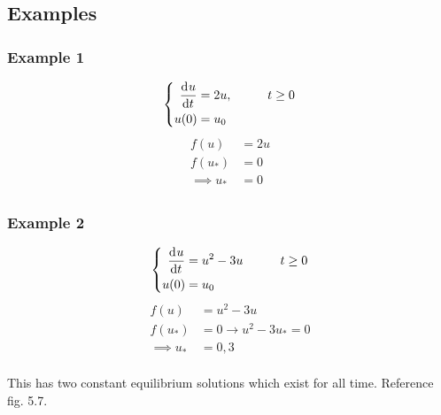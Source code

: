 \documentclass[12pt]{article}
\begin{document}
      \subsection{Examples}
      \subsubsection{Example 1}
      \begin{equation} \left\{
        \begin{aligned}
          \frac{\mathrm{d}^{} {u}}{\mathrm{d}{t}^{}} &= 2u, &\qquad t\ge0 \\
          u(0) &= u_0 \\
        \end{aligned} \right.
      \end{equation}
      \begin{equation}
        \begin{aligned}
          f(u) &= 2u \\
          f(u_*) &= 0 \\
          \implies u_* &= 0 \\
        \end{aligned}
      \end{equation}

      \subsubsection{Example 2}
      \begin{equation} \left\{
        \begin{aligned}
          \frac{\mathrm{d}^{} {u}}{\mathrm{d}{t}^{}} &= u^2-3u &\qquad t\ge0 \\
          u(0) &= u_0 \\
        \end{aligned} \right.
      \end{equation}
      \begin{equation}
        \begin{aligned}
          f(u) &= u^2-3u \\
          f(u_*) &= 0 \rightarrow u^2-3u_* = 0 \\
          \implies u_* &= 0,3 \\
        \end{aligned}
      \end{equation}

      This has two constant equilibrium solutions which exist for all time.
      Reference fig. 5.7.
\end{document}
